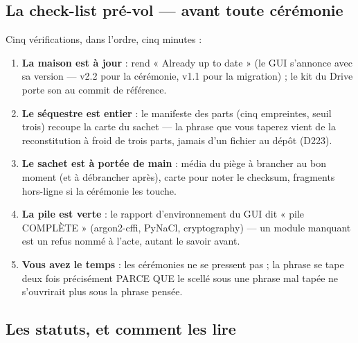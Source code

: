 \subsection{La check-list pré-vol — avant toute cérémonie}\label{sec:preflight}

Cinq vérifications, dans l'ordre, cinq minutes :

\begin{enumerate}
\item \textbf{La maison est à jour} :  rend « Already up to date »
(le GUI s'annonce avec sa version — v2.2 pour la cérémonie, v1.1 pour la migration) ;
le kit du Drive porte son  au commit de référence.
\item \textbf{Le séquestre est entier} : le manifeste des parts (cinq
empreintes, seuil trois) recoupe la carte du sachet — la phrase que vous
taperez vient de la reconstitution à froid de trois parts, jamais d'un
fichier au dépôt (D223).
\item \textbf{Le sachet est à portée de main} : média du piège à brancher au bon
moment (et à débrancher après), carte pour noter le checksum, fragments hors-ligne si
la cérémonie les touche.
\item \textbf{La pile est verte} : le rapport d'environnement du GUI dit
« pile COMPLÈTE » (argon2-cffi, PyNaCl, cryptography) — un module manquant est un
refus nommé à l'acte, autant le savoir avant.
\item \textbf{Vous avez le temps} : les cérémonies ne se pressent pas ; la phrase se
tape deux fois précisément PARCE QUE le scellé sous une phrase mal tapée ne
s'ouvrirait plus sous la phrase pensée.
\end{enumerate}

\subsection{Les statuts, et comment les lire}\label{sec:statuts}


